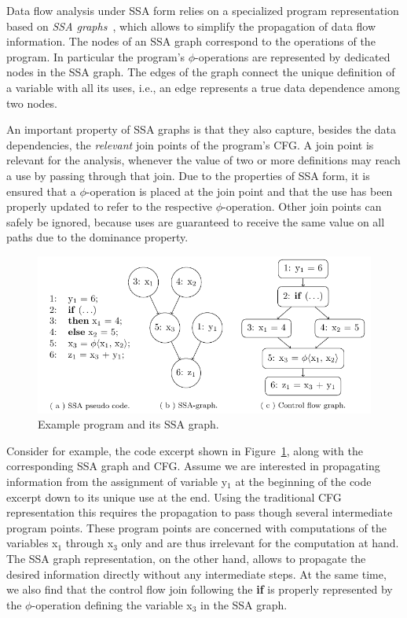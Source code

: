 Data flow analysis under SSA form relies on a specialized program
representation based on \emph{SSA
graphs}~\cite{novillo:bib:cytron.ea-91}, which
allows to simplify the propagation of data flow information. The nodes of an
SSA graph correspond to the operations of the program. In particular the
program's $\phi$-operations are represented by dedicated nodes in the SSA graph.
The edges of the graph connect the unique definition of a variable with all its
uses, i.e., an edge represents a true data dependence among two nodes.

An important property of SSA graphs is that they also capture, besides the data
dependencies, the \emph{relevant} join points of the program's CFG. A join point
is relevant for the analysis, whenever the value of two or more definitions may
reach a use by passing through that join. Due to the properties of SSA form, it
is ensured that a $\phi$-operation is placed at the join point and that the use
has been properly updated to refer to the respective $\phi$-operation. Other
join points can safely be ignored, because uses are guaranteed to receive the
same value on all paths due to the dominance property.

\begin{figure}[t]
  \begin{center}
    \includegraphics{ssa_graph}
  \end{center}
  \vspace{-2em}
  \caption{Example program and its SSA graph.}
  \label{novillo:fig:ssa_graph}
\end{figure}

Consider for example, the code excerpt shown in
Figure~\ref{novillo:fig:ssa_graph}, along with the corresponding SSA graph and
CFG. Assume we are interested in propagating information from the assignment of
variable y$_1$ at the beginning of the code excerpt down to its unique use at
the end. Using the traditional CFG representation this requires the propagation
to pass though several intermediate program points. These program points are
concerned with computations of the variables x$_1$  through x$_3$ only and are
thus irrelevant for the computation at hand. The SSA graph representation, on
the other hand, allows to propagate the desired information directly without any
intermediate steps. At the same time, we also find that the control flow join
following the \textbf{if} is properly represented by the $\phi$-operation
defining the variable x$_3$ in the SSA graph.

